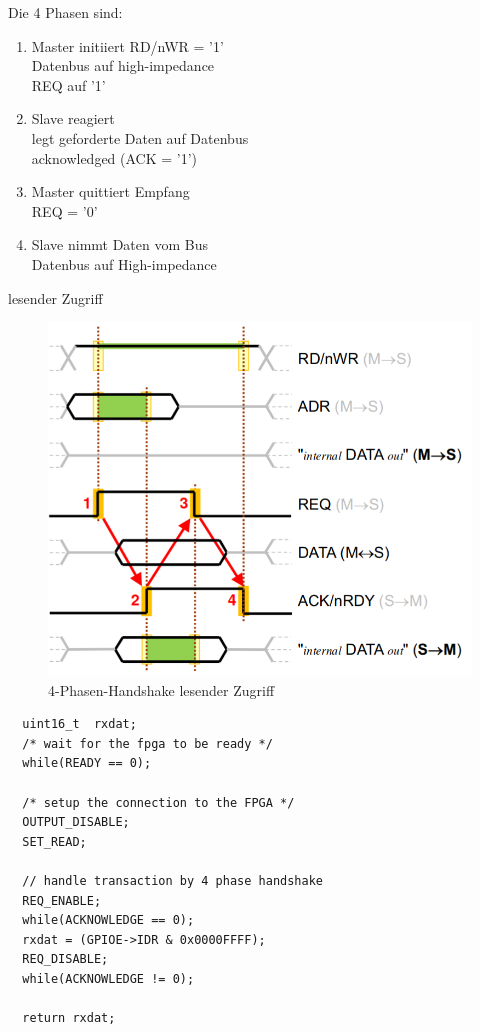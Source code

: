   \begin{frame} {}
    Die 4 Phasen sind:
    \begin{enumerate}
      \setlength\itemsep{.5cm}
      \item Master initiiert RD/nWR = '1'\\
            Datenbus auf high-impedance\\
            REQ auf '1'
      \item Slave reagiert\\
            legt geforderte Daten auf Datenbus \\
            acknowledged (ACK = '1')
      \item Master quittiert Empfang\\
            REQ = '0'
      \item Slave nimmt Daten vom Bus\\
            Datenbus auf High-impedance
    \end{enumerate}
  \end{frame}


  \begin{frame} {lesender Zugriff}
    \begin{figure}[ht]
      \centering
      \includegraphics[height=0.7\textheight]{figs/lesen_phase.png}
      \caption{4-Phasen-Handshake lesender Zugriff}
    \end{figure}
  \end{frame}


  \begin{frame} [fragile]
    \begin{lstlisting}
  uint16_t  rxdat;
  /* wait for the fpga to be ready */
  while(READY == 0);

  /* setup the connection to the FPGA */
  OUTPUT_DISABLE;
  SET_READ;

  // handle transaction by 4 phase handshake
  REQ_ENABLE;
  while(ACKNOWLEDGE == 0);
  rxdat = (GPIOE->IDR & 0x0000FFFF);
  REQ_DISABLE;
  while(ACKNOWLEDGE != 0);

  return rxdat;
    \end{lstlisting}
  \end{frame}


